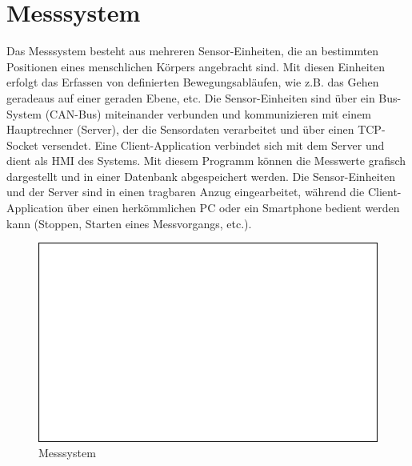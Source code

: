 \chapter{Messsystem}
Das Messsystem besteht aus mehreren Sensor-Einheiten, die an bestimmten Positionen eines menschlichen Körpers angebracht sind. Mit diesen Einheiten erfolgt das Erfassen von definierten Bewegungsabläufen, wie z.B. das Gehen geradeaus auf einer geraden Ebene, etc.
Die Sensor-Einheiten sind über ein Bus-System (CAN-Bus) miteinander verbunden und kommunizieren mit einem Hauptrechner (Server), der die Sensordaten verarbeitet und über einen TCP-Socket versendet. Eine Client-Application verbindet sich mit dem Server und dient als HMI des Systems.
Mit diesem Programm können die Messwerte grafisch dargestellt und in einer Datenbank abgespeichert werden.
\newline
Die Sensor-Einheiten und der Server sind in einen tragbaren Anzug eingearbeitet, während die Client-Application über einen herkömmlichen PC oder ein Smartphone bedient werden kann (Stoppen, Starten eines Messvorgangs, etc.).

\begin{figure}[H]
\centering
\includegraphics[width=0.7\linewidth]{Bilder/pseudoImage}
	\caption[Messsystem]{Messsystem}
\label{fig:messsystem}
\end{figure}





